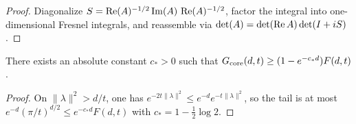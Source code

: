 \begin{proof}\leanok
Diagonalize $S=\operatorname{Re}(A)^{-1/2}\,\mathrm{Im}(A)\,\operatorname{Re}(A)^{-1/2}$,
factor the integral into one-dimensional Fresnel integrals,
and reassemble via $\det(A)=\det(\operatorname{Re} A)\det(I+iS)$.
\end{proof}

\begin{lemma}\label{lem:inner-core}
\leanok
There exists an absolute constant $c_*>0$ such that
$G_{\mathrm{core}}(d,t)\ge (1-e^{-c_*d})F(d,t)$.
\end{lemma}

\begin{proof}\leanok
On $\|\lambda\|^2>d/t$, one has $e^{-2t\|\lambda\|^2}\le e^{-d}e^{-t\|\lambda\|^2}$,
so the tail is at most $e^{-d}(\pi/t)^{d/2}\le e^{-c_*d}F(d,t)$
with $c_*=1-\frac12\log 2$.
\end{proof}
